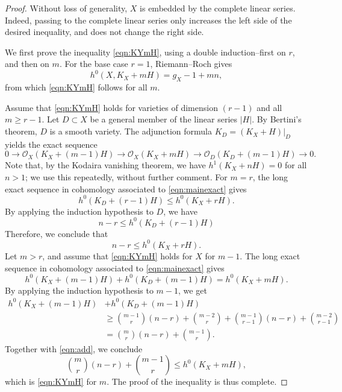 \documentclass[11pt,reqno]{amsart}
\theoremstyle{plain}
\theoremstyle{definition}
\theoremstyle{remark}
\numberwithin{equation}{section}
\renewcommand{\to}{{\longrightarrow}}
\numberwithin{equation}{section}
\renewcommand{\O}{\mathcal O}
\begin{document}
\begin{proof}
  Without loss of generality, $X$ is embedded by the complete linear series.
  Indeed, passing to the complete linear series only increases the left side of the desired inequality, and does not change the right side.
  
  We first prove the inequality \eqref{eqn:KYmH}, using a double induction--first on $r$, and then on $m$.
  For the base case $r = 1$, Riemann--Roch gives
  \begin{equation}\label{eqn:r1}
    h^0(X, K_X + mH) = g_X - 1 + mn,
  \end{equation}
  from which \eqref{eqn:KYmH} follows for all $m$.

  Assume that \eqref{eqn:KYmH} holds for varieties of dimension $(r-1)$ and all $m \geq r-1$.
  Let $D \subset X$ be a general member of the linear series $|H|$.
  By Bertini's theorem, $D$ is a smooth variety.
  The adjunction formula $K_D = (K_X + H)|_D$ yields the exact sequence
  \begin{equation}\label{eqn:mainexact}
    0 \to \O_X(K_X + (m-1)H) \to \O_X(K_X + mH) \to \O_D(K_D + (m-1)H) \to 0.
  \end{equation}
  Note that, by the Kodaira vanishing theorem, we have $h^1(K_X + nH) = 0$ for all $n > 1$; we use this repeatedly, without further comment.
  For $m = r$, the long exact sequence in cohomology associated to \eqref{eqn:mainexact} gives
  \[ h^0(K_D + (r-1)H) \leq h^0(K_X + rH).\]
  By applying the induction hypothesis to $D$, we have
  \begin{equation}
    n-r \leq h^0(K_D + (r-1)H)
  \end{equation}
  Therefore, we conclude that
  \begin{equation}
    n-r \leq h^0(K_X + rH).
  \end{equation}
  Let $m > r$, and assume that \eqref{eqn:KYmH} holds for $X$ for $m-1$.
  The long exact sequence in cohomology associated to \eqref{eqn:mainexact} gives
  \begin{equation}\label{eqn:add}
    h^0(K_X + (m-1)H) + h^0(K_D + (m-1)H) = h^0(K_X + mH).
  \end{equation}
  By applying the induction hypothesis to $m-1$, we get
  \begin{align*}
    h^0(K_X + (m-1)H) &+ h^0(K_D + (m-1)H)\\
                      &\geq{{m-1} \choose r}(n-r) + {{m-2} \choose {r}} + {{m-1} \choose {r-1}}(n-r) + {{m-2} \choose r-1} \\
                      &={m \choose r} (n-r) + {{m-1} \choose r}.
  \end{align*}
  Together with \eqref{eqn:add}, we conclude 
  \begin{equation}
    {m \choose r} (n-r) + {{m-1} \choose r} \leq h^0(K_X + mH), 
  \end{equation}
  which is \eqref{eqn:KYmH} for $m$.
  The proof of the inequality is thus complete.


\end{proof}
\end{document}
